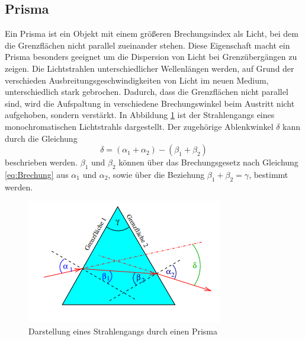 \subsection{Prisma}
Ein Prisma ist ein Objekt mit einem größeren Brechungsindex als Licht, bei dem die Grenzflächen
nicht parallel zueinander stehen. Diese Eigenschaft macht ein Prisma besonders geeignet um die Dispersion von Licht bei
Grenzübergängen zu zeigen. Die Lichtstrahlen unterschiedlicher Wellenlängen werden, auf Grund der verschieden Ausbreitungsgeschwindigkeiten
von Licht im neuen Medium, unterschiedlich stark gebrochen. Dadurch, dass die Grenzflächen nicht parallel sind, wird die Aufspaltung in verschiedene Brechungswinkel
beim Austritt nicht aufgehoben, sondern verstärkt. In Abbildung \ref{fig:Prisma} ist der Strahlengangs eines 
monochromatischen Lichtstrahls dargestellt. Der zugehörige Ablenkwinkel $\delta$ kann
durch die Gleichung
\begin{equation}
    \delta=(\alpha_1+\alpha_2)-(\beta_1+\beta_2)
    \label{eq:Prisma}
\end{equation}
beschrieben werden. $\beta_1$ und $\beta_2$ können über das Brechungsgesetz nach Gleichung \eqref{eq:Brechung} aus $\alpha_1$
und $\alpha_2$, sowie über die Beziehung $\beta_1+\beta_2=\gamma$, bestimmt werden.
\begin{figure}
    \centering
    \includegraphics{content/Prisma.png}
    \caption{Darstellung eines Strahlengangs durch einen Prisma\cite{V400}}
    \label{fig:Prisma}
\end{figure}
